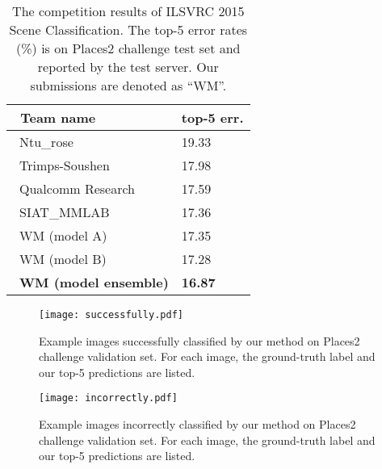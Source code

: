\documentclass[runningheads]{llncs}
\begin{document}
\begin{table}[t]
\setlength{\belowcaptionskip}{0pt}
\renewcommand\arraystretch{1.1}
\begin{center}
\begin{tabular}{p{4.5cm}|p{2.4cm}<{\centering}}
\hline
\ Team name & top-5 err. \\
\hline
\ Ntu\_rose & 19.33 \\
\ Trimps-Soushen & 17.98 \\
\ Qualcomm Research & 17.59 \\
\ SIAT\_MMLAB & 17.36 \\
\hline
\ WM (model A) & 17.35 \\
\ WM (model B) & 17.28 \\
\ \textbf{WM (model ensemble)} & \textbf{16.87} \\
\hline
\end{tabular}
\end{center}
\caption{The competition results of ILSVRC 2015 Scene Classification.
The top-5 error rates (\%) is on Places2 challenge test set and reported by the test server.
Our submissions are denoted as ``WM''.}
\label{places2:ILSVRC}
\end{table}

\begin{figure}[t]
\setlength{\abovecaptionskip}{0pt}
\begin{center}
\texttt{[image: successfully.pdf]}
\end{center}
\caption{Example images successfully classified by our method on Places2 challenge validation set.
For each image, the ground-truth label and our top-5 predictions are listed.}
\label{fig:successfully}
\end{figure}

\begin{figure}[t]
\setlength{\abovecaptionskip}{0pt}
\begin{center}
\texttt{[image: incorrectly.pdf]}
\end{center}
\caption{Example images incorrectly classified by our method on Places2 challenge validation set.
For each image, the ground-truth label and our top-5 predictions are listed.}
\label{fig:incorrectly}
\end{figure}
\end{document}
